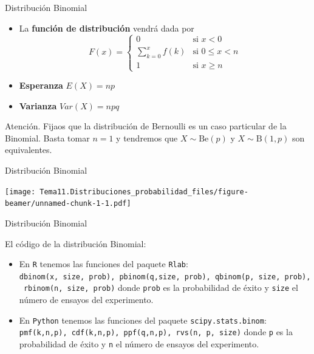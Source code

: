 \documentclass[
  ignorenonframetext,
]{beamer}
\providecommand{\tightlist}{%
  \setlength{\itemsep}{0pt}\setlength{\parskip}{0pt}}
\begin{document}
\begin{frame}{Distribución Binomial}
\protect\hypertarget{distribuciuxf3n-binomial-1}{}

\begin{itemize}
\tightlist
\item
  La \textbf{función de distribución} vendrá dada por \[F(x) = \left\{
  \begin{array}{cl}
     0 & \text{si } x<0 
  \\ \sum_{k=0}^xf(k) & \text{si } 0\le x<n
  \\ 1 & \text{si } x\ge n
  \end{array}
  \right.\]
\item
  \textbf{Esperanza} \(E(X) = np\)
\item
  \textbf{Varianza} \(Var(X) = npq\)
\end{itemize}

Atención. Fijaos que la distribución de Bernoulli es un caso particular
de la Binomial. Basta tomar \(n=1\) y tendremos que
\(X\sim \text{Be}(p)\) y \(X\sim\text{B}(1,p)\) son equivalentes.

\end{frame}

\begin{frame}{Distribución Binomial}
\protect\hypertarget{distribuciuxf3n-binomial-2}{}

\texttt{[image: Tema11.Distribuciones\_probabilidad\_files/figure-beamer/unnamed-chunk-1-1.pdf]}

\end{frame}

\begin{frame}[fragile]{Distribución Binomial}
\protect\hypertarget{distribuciuxf3n-binomial-3}{}

El código de la distribución Binomial:

\begin{itemize}
\tightlist
\item
  En \texttt{R} tenemos las funciones del paquete \texttt{Rlab}:
  \texttt{dbinom(x,\ size,\ prob),\ pbinom(q,size,\ prob),\ qbinom(p,\ size,\ prob),\ rbinom(n,\ size,\ prob)}
  donde \texttt{prob} es la probabilidad de éxito y \texttt{size} el
  número de ensayos del experimento.
\item
  En \texttt{Python} tenemos las funciones del paquete
  \texttt{scipy.stats.binom}:
  \texttt{pmf(k,n,p),\ cdf(k,n,p),\ ppf(q,n,p),\ rvs(n,\ p,\ size)}
  donde \texttt{p} es la probabilidad de éxito y \texttt{n} el número de
  ensayos del experimento.
\end{itemize}

\end{frame}
\end{document}
